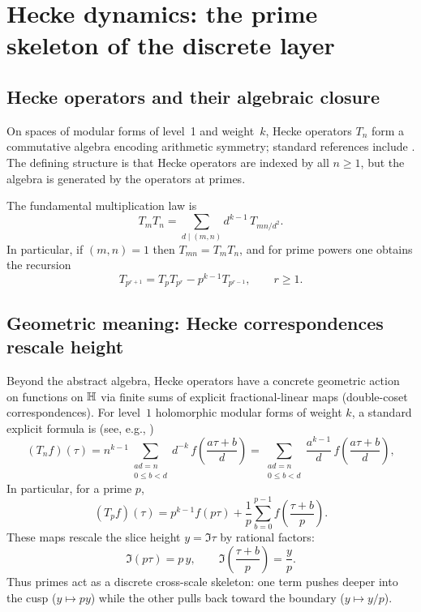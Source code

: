 
\section{Hecke dynamics: the prime skeleton of the discrete layer}
\label{sec:hecke_dynamics_prime}

\subsection{Hecke operators and their algebraic closure}
\label{sec:hecke_operators}

On spaces of modular forms of level~1 and weight~$k$, Hecke operators $T_n$ form a commutative algebra encoding arithmetic symmetry; standard references include \cite{Apostol1990,DiamondShurman2005}. The defining structure is that Hecke operators are indexed by all $n\ge 1$, but the algebra is generated by the operators at primes.

The fundamental multiplication law is
\begin{equation}
\label{eq:hecke_multiplication_law}
T_m T_n = \sum_{d\mid (m,n)} d^{k-1}\,T_{mn/d^2}.
\end{equation}
In particular, if $(m,n)=1$ then $T_{mn}=T_mT_n$, and for prime powers one obtains the recursion
\begin{equation}
\label{eq:hecke_prime_power}
T_{p^{r+1}} = T_p T_{p^r} - p^{k-1} T_{p^{r-1}},\qquad r\ge 1.
\end{equation}

\subsection{Geometric meaning: Hecke correspondences rescale height}
\label{sec:hecke_geometric_scaling}

Beyond the abstract algebra, Hecke operators have a concrete geometric action on functions on $\mathbb{H}$ via finite sums of explicit fractional-linear maps (double-coset correspondences). For level~$1$ holomorphic modular forms of weight $k$, a standard explicit formula is (see, e.g., \cite{Apostol1990,DiamondShurman2005})
\begin{equation}
\label{eq:hecke_explicit_formula}
(T_n f)(\tau)=n^{k-1}\sum_{\substack{ad=n\\0\le b<d}} d^{-k}\, f\!\left(\frac{a\tau+b}{d}\right)
=\sum_{\substack{ad=n\\0\le b<d}} \frac{a^{k-1}}{d}\, f\!\left(\frac{a\tau+b}{d}\right),
\end{equation}
In particular, for a prime $p$,
\begin{equation}
\label{eq:hecke_prime_formula}
(T_p f)(\tau)=p^{k-1}f(p\tau)+\frac{1}{p}\sum_{b=0}^{p-1} f\!\left(\frac{\tau+b}{p}\right).
\end{equation}
These maps rescale the slice height $y=\Im\tau$ by rational factors:
\begin{equation}
\Im(p\tau)=p\,y,\qquad \Im\!\left(\frac{\tau+b}{p}\right)=\frac{y}{p}.
\end{equation}
Thus primes act as a discrete cross-scale skeleton: one term pushes deeper into the cusp ($y\mapsto p y$) while the other pulls back toward the boundary ($y\mapsto y/p$).

